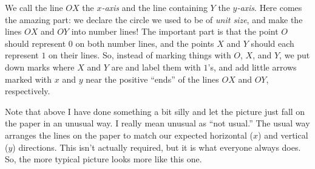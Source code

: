 \documentclass[00-livre-main.tex]{subfiles}
\begin{document}
\begin{figure}[h!]
\centering
{}
\end{figure}

We call the line $OX$ the \emph{$x$-axis} and the line containing $Y$ the \emph{$y$-axis}. Here comes the amazing part: we declare the circle we used to be of \emph{unit size}, and make the lines $OX$ and $OY$ into number lines! The important part is that the point $O$ should represent $0$ on both number lines, and the points $X$ and $Y$ should each represent $1$ on their lines. So, instead of marking things with $O$, $X$, and $Y$, we put down marks where $X$ and $Y$ are and label them with $1$'s, and add little arrows marked with $x$ and $y$ near the positive ``ends'' of the lines $OX$ and $OY$, respectively.

\begin{figure}[h!]
\centering
{}
\end{figure}

Note that above I have done something a bit silly and let the picture just fall on the paper in an unusual way. 
I really mean unusual as ``not usual.'' 
The usual way arranges the lines on the paper to match our expected horizontal ($x$) and vertical ($y$) directions. 
This isn't actually required, but it is what everyone always does. 
So, the more typical picture looks more like this one.


\begin{figure}[h]
\centering
{}
\end{figure}
\end{document}

